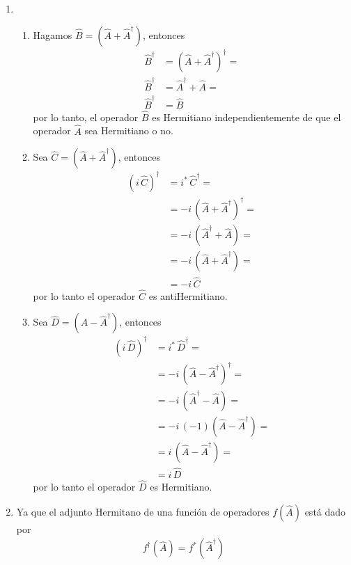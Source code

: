 \begin{enumerate}
\item 
\begin{enumerate}
\item Hagamos $\hat{B} = \left( \hat{A} + \hat{A}^{\dagger} \right)$, entonces
\begin{align*}
\hat{B}^{\dagger} &= \left( \hat{A} + \hat{A}^{\dagger} \right)^{\dagger} = \\
\hat{B}^{\dagger} &= \hat{A}^{\dagger} + \hat{A} = \\
\hat{B}^{\dagger} &= \hat{B}
\end{align*}
por lo tanto, el operador $\hat{B}$ es Hermitiano independientemente de que el operador $\hat{A}$ sea Hermitiano o no.
\item Sea $\hat{C} = \left( \hat{A} + \hat{A}^{\dagger} \right)$, entonces
\begin{align*}
\left(i \, \hat{C} \right)^{\dagger} &= i^{*} \, \hat{C}^{\dagger} = \\
&= -i \, \left( \hat{A} + \hat{A}^{\dagger} \right)^{\dagger} = \\
&= -i \, \left( \hat{A}^{\dagger} + \hat{A} \right) = \\
&= -i \, \left( \hat{A} + \hat{A}^{\dagger} \right) = \\
&= - i \, \hat{C}
\end{align*}
por lo tanto el operador $\hat{C}$ es antiHermitiano.
\item Sea $\hat{D} = \left( \hat{A} - \hat{A}^{\dagger} \right)$, entonces
\begin{align*}
\left(i \, \hat{D} \right)^{\dagger} &= i^{*} \, \hat{D}^{\dagger} = \\
&= -i \, \left( \hat{A} - \hat{A}^{\dagger} \right)^{\dagger} = \\
&= -i \, \left( \hat{A}^{\dagger} - \hat{A} \right) = \\
&= -i \, (-1) \left( \hat{A} - \hat{A}^{\dagger} \right) = \\
&= i \, \left( \hat{A} - \hat{A}^{\dagger} \right) = \\
&= i \, \hat{D}
\end{align*}
por lo tanto el operador $\hat{D}$ es Hermitiano.
\end{enumerate}
\item Ya que el adjunto Hermitano de una función de operadores $f(\hat{A})$ está dado por
\begin{align*}
f^{\dagger}(\hat{A}) = f^{*}(\hat{A}^{\dagger})
\end{align*}

\end{enumerate}
